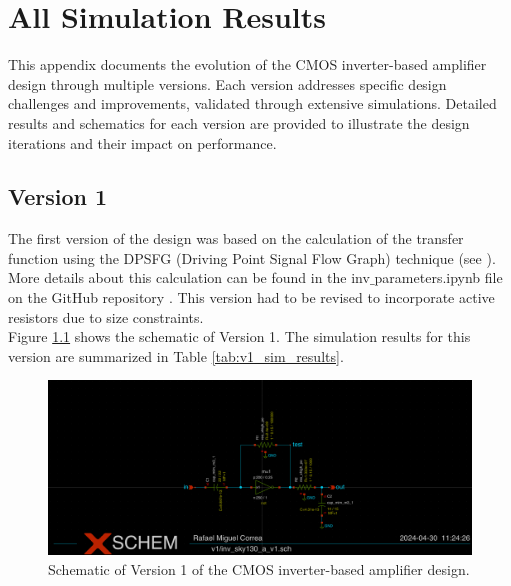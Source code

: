 \chapter{All Simulation Results}
\label{AppendixA}

This appendix documents the evolution of the CMOS inverter-based amplifier design through multiple versions. Each version addresses specific design challenges and improvements, validated through extensive simulations. Detailed results and schematics for each version are provided to illustrate the design iterations and their impact on performance.

\section{Version 1}

The first version of the design was based on the calculation of the transfer function using the DPSFG (Driving Point Signal Flow Graph) technique (see \textcite{Schmid_Huber_2018}). 
More details about this calculation can be found in the inv$\_$parameters.ipynb file on the GitHub repository \cite{miguelcorrea0107_2024}. 
This version had to be revised to incorporate active resistors due to size constraints.
\\
Figure \ref{fig:v1_schematic} shows the schematic of Version 1. 
The simulation results for this version are summarized in Table \ref{tab:v1_sim_results}.
\begin{figure}[ht!]
    \centering
    \includegraphics[width=\textwidth]{Figures/v1_schematic.png}
    \caption{Schematic of Version 1 of the CMOS inverter-based amplifier design.}
    \label{fig:v1_schematic}
\end{figure}

